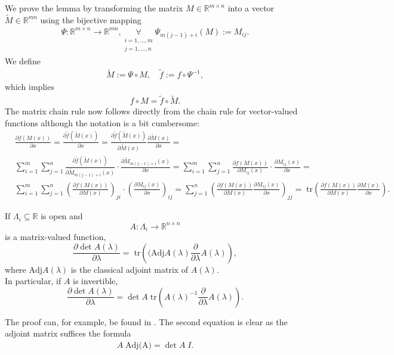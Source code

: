 \documentclass[a4paper,11pt]{report}
\newcommand{\tr}{\;\text{tr}}
\begin{document}
\begin{appendices}
\begin{Bew}
We prove the lemma by transforming the matrix $M\in\mathbb{R}^{m\times n}$ into a vector $\tilde{M}\in\mathbb{R}^{mn}$ using the bijective mapping
\begin{align*}
\Psi:\mathbb{R}^{m\times n}\to\mathbb{R}^{mn},
\underset{\substack{i=1,\dotsc,m\\j=1,\dotsc,n}}{\forall}\Psi_{m(j-1)+i}(M):=M_{ij}.
\end{align*}
We define
\begin{align*}
\tilde{M}:=\Psi\circ M,
\quad
\tilde{f}:=f\circ\Psi^{-1},
\end{align*}
which implies
\begin{align*}
f\circ M=\tilde{f}\circ\tilde{M}.
\end{align*}
The matrix chain rule now follows directly from the chain rule for vector-valued functions although the notation is a bit cumbersome:
\begin{align*}
&\frac{\partial f\left(M(x)\right)}{\partial x}=
\frac{\partial\tilde{f}\left(\tilde{M}(x)\right)}{\partial x}=
\frac{\partial\tilde{f}\left(\tilde{M}(x)\right)}{\partial \tilde{M}(x)}\frac{\partial\tilde{M}(x)}{\partial x}=\\
&\sum_{i=1}^m\sum_{j=1}^n
\frac{\partial\tilde{f}\left(\tilde{M}(x)\right)}{\partial\tilde{M}_{m(j-1)+i}(x)}\cdot
\frac{\partial\tilde{M}_{m(j-1)+i}(x)}{\partial x}=
\sum_{i=1}^m\sum_{j=1}^n
\frac{\partial f\left(M(x)\right)}{\partial M_{ij}(x)}\cdot
\frac{\partial M_{ij}(x)}{\partial x}=\\
&\sum_{i=1}^m\sum_{j=1}^n
\left(\frac{\partial f\left(M(x)\right)}{\partial M(x)}\right)_{ji}\cdot
\left(\frac{\partial M_{ij}(x)}{\partial x}\right)_{ij}=
\sum_{j=1}^n\left(\frac{\partial f\left(M(x)\right)}{\partial M(x)}\frac{\partial M_{ij}(x)}{\partial x}\right)_{jj}=
\tr\left(\frac{\partial f\left(M(x)\right)}{\partial M(x)}\frac{\partial M(x)}{\partial x}\right).
\end{align*}
\end{Bew}

\begin{Lem}\label{jacobis-formula}
If $\Lambda_i\subseteq\mathbb{R}$ is open and
\[
A:\Lambda_i\to\mathbb{R}^{n\times n}
\]
is a matrix-valued function, 
\[
\frac{\partial \det A(\lambda)}{\partial\lambda}=\tr\left((\text{Adj}A(\lambda)\frac{\partial}{\partial\lambda}A(\lambda)\right),
\]
where $\text{Adj}A(\lambda)$ is the classical adjoint matrix of $A(\lambda)$.\\
In particular, if $A$ is invertible,
\[
\frac{\partial \det A(\lambda)}{\partial\lambda}=\det A\tr\left(A(\lambda)^{-1}\frac{\partial}{\partial\lambda}A(\lambda)\right).
\]
\end{Lem}

\begin{Bew}
The proof can, for example, be found in \cite{Golberg1972}. The second equation is clear as the adjoint matrix suffices the formula
\begin{align*}
A\;\text{Adj(A)}=\det A\;I.
\end{align*}
\end{Bew}

\end{appendices}
\end{document}
